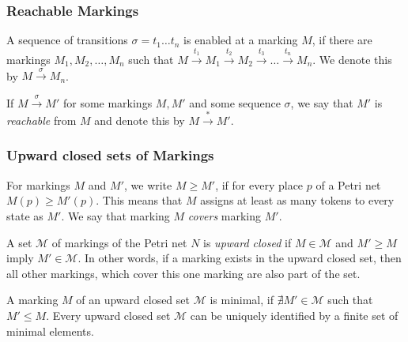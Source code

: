 \subsubsection{Reachable Markings}
A sequence of transitions $\sigma = t_{1} \dots t_{n}$ is enabled at a marking $M$, if there are markings $M_{1},M_{2},\dots,M_{n}$ such that $M \xrightarrow{t_{1}} M_{1} \xrightarrow{t_{2}} M_{2} \xrightarrow{t_{3}} \dots \xrightarrow{t_{n}} M_{n}$. We denote this by $M \xrightarrow{\sigma} M_{n}$. 

If $M \xrightarrow{\sigma} M'$ for some markings $M,M'$ and some sequence $\sigma$, we say that $M'$ is \emph{reachable} from $M$ and denote this by $M \xrightarrow{*} M'$.


\subsubsection{Upward closed sets of Markings}
For markings $M$ and $M'$, we write $M \ge M'$, if for every place $p$ of a Petri net $M(p) \ge M'(p)$. This means that $M$ assigns at least as many tokens to every state as $M'$. We say that marking $M$ \emph{covers} marking $M'$.


A set $\mathcal{M}$ of markings of the Petri net $N$ is \emph{upward closed} if $M \in \mathcal{M}$ and $M' \ge M$ imply $M' \in \mathcal{M}$. In other words, if a marking exists in the upward closed set, then all other markings, which cover this one marking are also part of the set.

A marking $M$ of an upward closed set $\mathcal{M}$ is minimal, if $\nexists M' \in \mathcal{M}$ such that $M' \le M$. Every upward closed set $\mathcal{M}$ can be uniquely identified by a finite set of minimal elements. 
